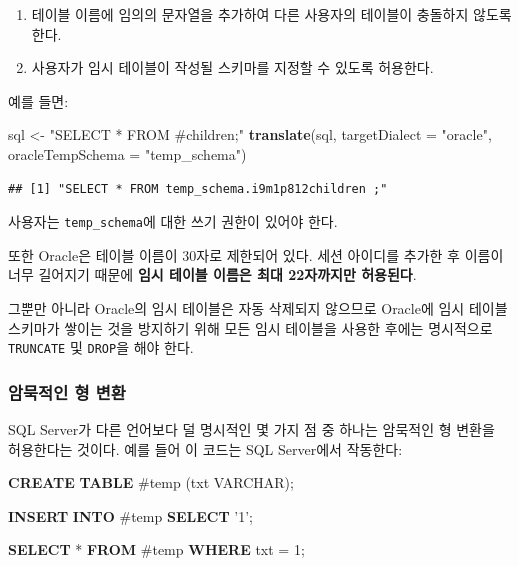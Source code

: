 \documentclass[10.5pt]{book}
\newenvironment{Shaded}{\begin{snugshade}}{\end{snugshade}}
\newcommand{\KeywordTok}[1]{\textcolor[rgb]{0.13,0.29,0.53}{\textbf{#1}}}
\newcommand{\DataTypeTok}[1]{\textcolor[rgb]{0.13,0.29,0.53}{#1}}
\newcommand{\DecValTok}[1]{\textcolor[rgb]{0.00,0.00,0.81}{#1}}
\newcommand{\StringTok}[1]{\textcolor[rgb]{0.31,0.60,0.02}{#1}}
\newcommand{\NormalTok}[1]{#1}
\providecommand{\tightlist}{%
  \setlength{\itemsep}{0pt}\setlength{\parskip}{0pt}}
\theoremstyle{definition}
\theoremstyle{definition}
\theoremstyle{definition}
\theoremstyle{remark}
\begin{document}
\begin{enumerate}
\def\labelenumi{\arabic{enumi}.}
\tightlist
\item
  테이블 이름에 임의의 문자열을 추가하여 다른 사용자의 테이블이 충돌하지
  않도록 한다.
\item
  사용자가 임시 테이블이 작성될 스키마를 지정할 수 있도록 허용한다.
\end{enumerate}

예를 들면:

\begin{Shaded}
\begin{Highlighting}[]
\NormalTok{sql <-}\StringTok{ "SELECT * FROM #children;"}
\KeywordTok{translate}\NormalTok{(sql, }\DataTypeTok{targetDialect =} \StringTok{"oracle"}\NormalTok{, }\DataTypeTok{oracleTempSchema =} \StringTok{"temp_schema"}\NormalTok{)}
\end{Highlighting}
\end{Shaded}

\begin{verbatim}
## [1] "SELECT * FROM temp_schema.i9m1p812children ;"
\end{verbatim}

사용자는 \texttt{temp\_schema}에 대한 쓰기 권한이 있어야 한다.

또한 Oracle은 테이블 이름이 30자로 제한되어 있다. 세션 아이디를 추가한
후 이름이 너무 길어지기 때문에 \textbf{임시 테이블 이름은 최대
22자까지만 허용된다}.

그뿐만 아니라 Oracle의 임시 테이블은 자동 삭제되지 않으므로 Oracle에
임시 테이블 스키마가 쌓이는 것을 방지하기 위해 모든 임시 테이블을 사용한
후에는 명시적으로 \texttt{TRUNCATE} 및 \texttt{DROP}을 해야 한다.

\subsubsection*{암묵적인 형 변환}\label{--}

SQL Server가 다른 언어보다 덜 명시적인 몇 가지 점 중 하나는 암묵적인 형
변환을 허용한다는 것이다. 예를 들어 이 코드는 SQL Server에서 작동한다:

\begin{Shaded}
\begin{Highlighting}[]
\KeywordTok{CREATE} \KeywordTok{TABLE}\NormalTok{ #temp (txt }\DataTypeTok{VARCHAR}\NormalTok{);}

\KeywordTok{INSERT} \KeywordTok{INTO}\NormalTok{ #temp}
\KeywordTok{SELECT} \StringTok{'1'}\NormalTok{;}

\KeywordTok{SELECT}\NormalTok{ * }\KeywordTok{FROM}\NormalTok{ #temp }\KeywordTok{WHERE}\NormalTok{ txt = }\DecValTok{1}\NormalTok{;}
\end{Highlighting}
\end{Shaded}
\end{document}

